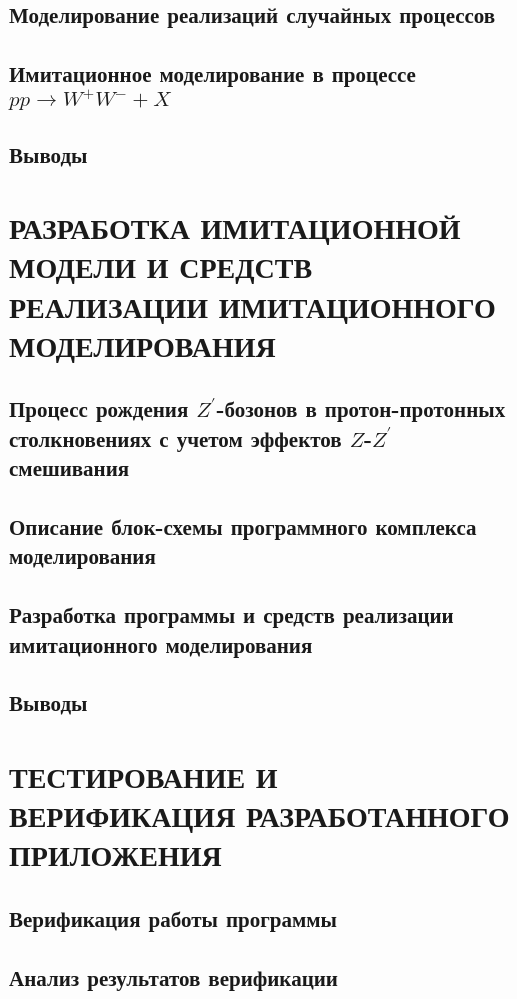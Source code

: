 \documentclass[12pt,a4paper]{styles/report}
\begin{document}
\section{Моделирование реализаций случайных процессов}

\section{Имитационное моделирование в процессе $pp \rightarrow W^+W^- + X$}


\section{Выводы}



\chapter{РАЗРАБОТКА ИМИТАЦИОННОЙ МОДЕЛИ И СРЕДСТВ РЕАЛИЗАЦИИ ИМИТАЦИОННОГО МОДЕЛИРОВАНИЯ}
\section{Процесс рождения $Z^\prime$-бозонов в протон-протонных столкновениях с учетом эффектов $Z$-$Z^\prime$ смешивания}

\section{Описание блок-схемы программного комплекса
	моделирования}

\section{Разработка программы и средств реализации имитационного моделирования}

\section{Выводы}


\chapter{ТЕСТИРОВАНИЕ И ВЕРИФИКАЦИЯ РАЗРАБОТАННОГО ПРИЛОЖЕНИЯ}
\section{Верификация работы программы}

\section{Анализ результатов верификации}

\end{document}
